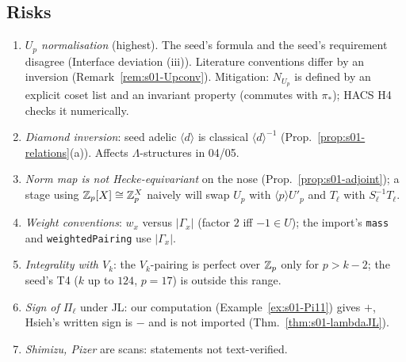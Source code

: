 \subsection{Risks}
\begin{enumerate}[label=R\arabic*.]
\item \emph{$U_p$ normalisation} (highest). The seed's formula and the seed's requirement disagree (Interface deviation (iii)).
  Literature conventions differ by an inversion (Remark~\ref{rem:s01-Upconv}). Mitigation: $N_{U_p}$ is defined by an explicit
  coset list and an invariant property (commutes with $\pi_*$); HACS H4 checks it numerically.
\item \emph{Diamond inversion}: seed adelic $\langle d\rangle$ is classical $\langle d\rangle^{-1}$ (Prop.~\ref{prop:s01-relations}(a)).
  Affects $\Lambda$-structures in 04/05.
\item \emph{Norm map is not Hecke-equivariant} on the nose (Prop.~\ref{prop:s01-adjoint}); a stage using $\mathbb{Z}_p[X]\cong\mathbb{Z}_p^X$ naively
  will swap $U_p$ with $\langle p\rangle U'_p$ and $T_\ell$ with $S_\ell^{-1}T_\ell$.
\item \emph{Weight conventions}: $w_x$ versus $|\Gamma_x|$ (factor $2$ iff $-1\in U$); the import's \texttt{mass} and
  \texttt{weightedPairing} use $|\Gamma_x|$.
\item \emph{Integrality with $V_k$}: the $V_k$-pairing is perfect over $\mathbb{Z}_p$ only for $p>k-2$; the seed's T4 ($k$ up to $124$,
  $p=17$) is outside this range.
\item \emph{Sign of $\Pi_\ell$} under JL: our computation (Example~\ref{ex:s01-Pi11}) gives $+$, Hsieh's written sign is $-$ and is not imported (Thm.~\ref{thm:s01-lambdaJL}).
\item \emph{Shimizu, Pizer} are scans: statements not text-verified.
\end{enumerate}
